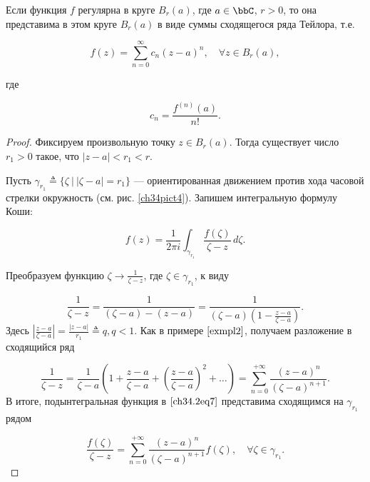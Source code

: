\begin{thm}
Если функция $f$ регулярна в круге $B_r(a)$, где $a \in \bbC$, $r > 0$, то она представима в этом круге $B_r(a)$ в виде суммы сходящегося ряда Тейлора, т.е.

\begin{equation} \label{ch34.2eq5}
f(z) = \sum\limits_{n = 0}^{\infty} c_n(z - a)^n, \quad \forall z \in B_r(a),
\end{equation}

где

\begin{equation} \label{ch34.2eq6}
c_n = \frac{f^{(n)}(a)}{n!}.
\end{equation}

\end{thm}
\begin{proof}
Фиксируем произвольную точку $z \in B_r(a)$. Тогда существует число $r_1 > 0$ такое, что $|z - a| < r_1 < r$.

Пусть $\gamma_{r_1} \triangleq \{\zeta \: \big| \: |\zeta - a| = r_1 \}$ — ориентированная движением против хода часовой стрелки окружность (см. рис. \ref{ch34pict4}). Запишем интегральную формулу Коши:

\begin{equation} \label{ch34.2eq7}
f(z) = \frac{1}{2 \pi i} \int_{\gamma_{r_1}} \frac{f(\zeta)}{\zeta - z} \,d\zeta.
\end{equation}

Преобразуем функцию $\zeta \to \frac{1}{\zeta - z}$, где $\zeta \in \gamma_{r_1}$, к виду

$$
\frac{1}{\zeta - z} = \frac{1}{(\zeta - a) - (z - a)} = \frac{1}{(\zeta - a)\left( 1 - \frac{z - a}{\zeta - a}\right)}.
$$
Здесь $\left|\frac{z - a}{\zeta - a} \right| = \frac{|z - a|}{r_1} \triangleq q, q < 1$. Как в примере $\ref{exmpl2}$, получаем разложение в сходящийся ряд

$$
\frac{1}{\zeta - z} = \frac{1}{\zeta - a} \left( 1 + \frac{z - a}{\zeta - a} + \left( \frac{z - a}{\zeta - a}\right)^2 + \ldots \right) = \sum\limits_{n = 0}^{+\infty} \frac{(z - a)^n}{(\zeta - a)^{n + 1}}.
$$
В итоге, подынтегральная функция в $\eqref{ch34.2eq7}$ представима сходящимся на $\gamma_{r_1}$ рядом

\begin{equation} \label{ch34.2eq8}
\frac{f(\zeta)}{\zeta - z} = \sum\limits_{n = 0}^{+\infty} \frac{(z - a)^n}{(\zeta - a)^{n + 1}} f(\zeta), \quad \forall \zeta \in \gamma_{r_1}.
\end{equation}


\end{proof}
